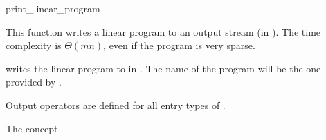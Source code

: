 \begin{ccRefFunction}{print_linear_program}


This function writes a linear program to an output stream (in 
). The time
complexity is $\Theta (mn)$, even if the program is very sparse.

{writes the linear program  to  in 
. The name of the program will be the one provided 
by .}

Output operators are defined for all entry types of .

\ccExample
{}

\ccSeeAlso

The concept

\end{ccRefFunction}
